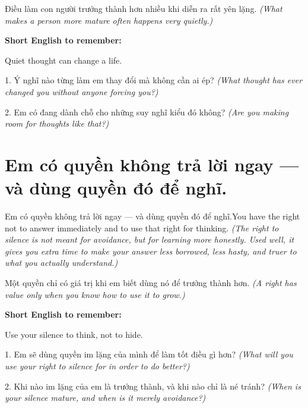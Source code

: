 \begin{baihoc}
Điều làm con người trưởng thành hơn nhiều khi diễn ra rất yên lặng.
\textit{(What makes a person more mature often happens very quietly.)}
\end{baihoc}

\begin{ghinhoanh}
\textbf{Short English to remember:}

Quiet thought can change a life.

\end{ghinhoanh}

\begin{tuhocnhanh}
1. Ý nghĩ nào từng làm em thay đổi mà không cần ai ép? \textit{(What thought has ever changed you without anyone forcing you?)}

2. Em có đang dành chỗ cho những suy nghĩ kiểu đó không? \textit{(Are you making room for thoughts like that?)}
\end{tuhocnhanh}
\ngancach


\section{Em có quyền không trả lời ngay — và dùng quyền đó để nghĩ.}
\begin{truyen}{Em có quyền không trả lời ngay — và dùng quyền đó để nghĩ.}{You have the right not to answer immediately and to use that right for thinking.}
\textit{(The right to silence is not meant for avoidance, but for learning more honestly. Used well, it gives you extra time to make your answer less borrowed, less hasty, and truer to what you actually understand.)}
\end{truyen}

\begin{baihoc}
Một quyền chỉ có giá trị khi em biết dùng nó để trưởng thành hơn.
\textit{(A right has value only when you know how to use it to grow.)}
\end{baihoc}

\begin{ghinhoanh}
\textbf{Short English to remember:}

Use your silence to think, not to hide.

\end{ghinhoanh}

\begin{tuhocnhanh}
1. Em sẽ dùng quyền im lặng của mình để làm tốt điều gì hơn? \textit{(What will you use your right to silence for in order to do better?)}

2. Khi nào im lặng của em là trưởng thành, và khi nào chỉ là né tránh? \textit{(When is your silence mature, and when is it merely avoidance?)}
\end{tuhocnhanh}
\ngancach
